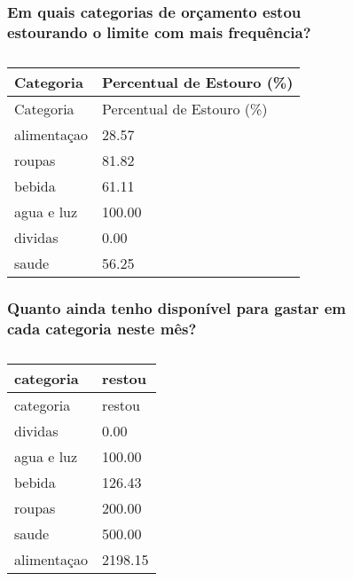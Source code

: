 \documentclass[
  8pt,
  a4paper,
  DIV=11,
  numbers=noendperiod]{scrartcl}
\begin{document}
\begin{figure}

\begin{minipage}{0.50\linewidth}

\subsubsection{Em quais categorias de orçamento estou estourando o
limite com mais
frequência?}\label{em-quais-categorias-de-oruxe7amento-estou-estourando-o-limite-com-mais-frequuxeancia}

\begin{longtable}[]{@{}ll@{}}
\caption{}\label{T_5fbb3}\tabularnewline
\toprule\noalign{}
Categoria & Percentual de Estouro (\%) \\
\midrule\noalign{}
\endfirsthead
\toprule\noalign{}
Categoria & Percentual de Estouro (\%) \\
\midrule\noalign{}
\endhead
\bottomrule\noalign{}
\endlastfoot
alimentaçao & 28.57 \\
roupas & 81.82 \\
bebida & 61.11 \\
agua e luz & 100.00 \\
dividas & 0.00 \\
saude & 56.25 \\
\end{longtable}

\end{minipage}%
%
\begin{minipage}{0.50\linewidth}

\subsubsection{Quanto ainda tenho disponível para gastar em cada
categoria neste
mês?}\label{quanto-ainda-tenho-disponuxedvel-para-gastar-em-cada-categoria-neste-muxeas}

\begin{longtable}[]{@{}ll@{}}
\caption{}\label{T_b8e1c}\tabularnewline
\toprule\noalign{}
categoria & restou \\
\midrule\noalign{}
\endfirsthead
\toprule\noalign{}
categoria & restou \\
\midrule\noalign{}
\endhead
\bottomrule\noalign{}
\endlastfoot
dividas & 0.00 \\
agua e luz & 100.00 \\
bebida & 126.43 \\
roupas & 200.00 \\
saude & 500.00 \\
alimentaçao & 2198.15 \\
\end{longtable}

\end{minipage}%

\end{figure}%
\end{document}
